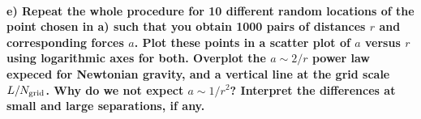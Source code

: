\paragraph{e) Repeat the whole procedure for 10 different random locations of 
    the point chosen in a) such that you obtain 1000 pairs of distances $r$ and 
    corresponding forces $a$. Plot these points in a scatter plot of $a$ versus
    $r$ using logarithmic axes for both. Overplot the $a\sim2/r$ power law 
    expeced for Newtonian gravity, and a vertical line at the grid scale 
    $L/N_\textnormal{grid}$. Why do we not expect $a\sim1/r^2$? Interpret the 
    differences at small and large separations, if any.
}
